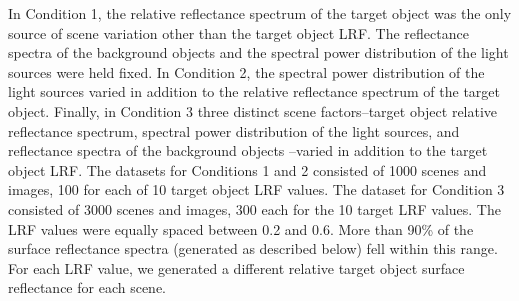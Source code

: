 \documentclass{jov}
\begin{document}
In Condition 1, the relative reflectance spectrum of the target object was the only source of scene variation other than the target object LRF.
The reflectance spectra of the background objects and the spectral power distribution of the light sources were held fixed.
In Condition 2, the spectral power distribution of the light sources varied in addition to the relative reflectance spectrum of the target object.
Finally, in Condition 3 three distinct scene factors--target object relative reflectance spectrum, spectral power distribution of the light sources, and reflectance spectra of the background objects
--varied in addition to the target object LRF.
The datasets for Conditions 1 and 2 consisted of 1000 scenes and images, 100 for each of 10 target object LRF values. 
The dataset for Condition 3 consisted of 3000 scenes and images, 300 each for the 10 target LRF values.
The LRF values were equally spaced between 0.2 and 0.6.
More than 90\% of the surface reflectance spectra (generated as described below) fell within this range.
For each LRF value, we generated a different relative target object surface reflectance for each scene. 
\end{document}
